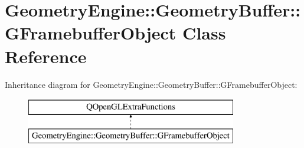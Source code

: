 \hypertarget{class_geometry_engine_1_1_geometry_buffer_1_1_g_framebuffer_object}{}\section{Geometry\+Engine\+::Geometry\+Buffer\+::G\+Framebuffer\+Object Class Reference}
\label{class_geometry_engine_1_1_geometry_buffer_1_1_g_framebuffer_object}
Inheritance diagram for Geometry\+Engine\+::Geometry\+Buffer\+::G\+Framebuffer\+Object\+:\begin{figure}[H]
\begin{center}
\leavevmode
\includegraphics[height=2.000000cm]{class_geometry_engine_1_1_geometry_buffer_1_1_g_framebuffer_object}
\end{center}
\end{figure}
